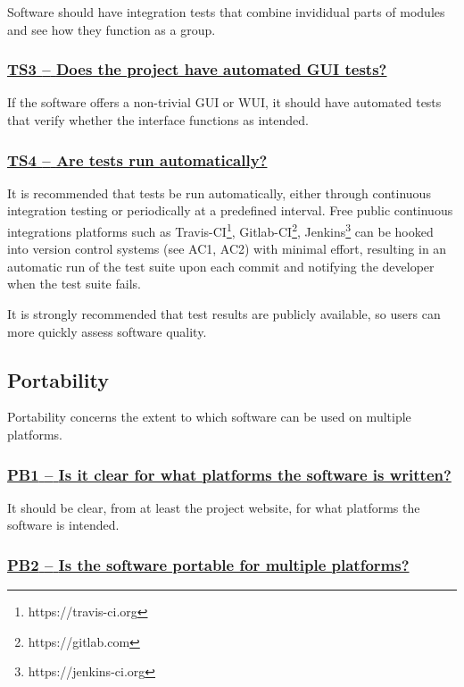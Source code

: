 \documentclass[a4paper,11pt]{article}
\newcommand{\indicator}[1]{\subsubsection*{\underline{#1}}}
\begin{document}
Software should have integration tests that combine invididual parts of modules and see how they function
as a group.

\newcommand{\tsThreeName}{TS3}
\newcommand{\tsThreeID}{\tsThreeName}
\newcommand{\tsThreeText}{Does the project have automated GUI tests?}
\indicator{\tsThreeName{ }--{ }\tsThreeText}\label{id:ts3} 

If the software offers a non-trivial GUI or WUI, it should have automated tests
that verify whether the interface functions as intended.

\newcommand{\tsFourName}{TS4}
\newcommand{\tsFourID}{\tsFourName}
\newcommand{\tsFourText}{Are tests run automatically?}
\indicator{\tsFourName{ }--{ }\tsFourText}\label{id:ts4} 

It is recommended that tests be run automatically, either through continuous
integration testing or periodically at a predefined interval. Free public
continuous integrations platforms such as
Travis-CI\footnote{https://travis-ci.org},
Gitlab-CI\footnote{https://gitlab.com},
Jenkins\footnote{https://jenkins-ci.org} can be hooked into version control
systems (see AC1, AC2) with minimal effort, resulting in an automatic run of the test suite
upon each commit and notifying the developer when the test suite fails.

It is strongly recommended that test results are publicly available, so users
can more quickly assess software quality.

\subsection{Portability}\label{sec:por}

Portability concerns the extent to which software can be used on multiple
platforms. 

\newcommand{\pbOneName}{PB1}
\newcommand{\pbOneID}{\pbOneName}
\newcommand{\pbOneText}{Is it clear for what platforms the software is written?}
\indicator{\pbOneName{ }--{ }\pbOneText}\label{id:pb1} 

It should be clear, from at least the project website, for what platforms the software
is intended.

\newcommand{\pbTwoName}{PB2}
\newcommand{\pbTwoID}{\pbTwoName}
\newcommand{\pbTwoText}{Is the software portable for multiple platforms?}
\indicator{\pbTwoName{ }--{ }\pbTwoText}\label{id:pb2} 
\end{document}
